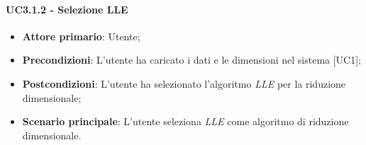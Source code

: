 \paragraph{UC3.1.2 - Selezione LLE}
\begin{itemize}
	\item \textbf{Attore primario}: Utente;
	\item \textbf{Precondizioni}: L'utente ha caricato i dati e le dimensioni nel sistema [UC1];
	\item \textbf{Postcondizioni}: L'utente ha selezionato l'algoritmo \textit{LLE} per la riduzione dimensionale;
	\item \textbf{Scenario principale}: L'utente seleziona \textit{LLE} come algoritmo di riduzione dimensionale.

\end{itemize}